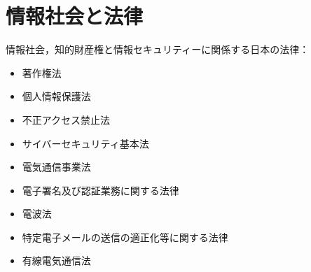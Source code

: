%

\section{情報社会と法律}
情報社会，知的財産権と情報セキュリティーに関係する日本の法律：
\begin{itemize}
   \item
   著作権法

   \item
   個人情報保護法
   \item   
   不正アクセス禁止法
   \item   
   サイバーセキュリティ基本法
   
   \item
   電気通信事業法
     \item    
   電子署名及び認証業務に関する法律
    \item     
   電波法
   \item   
   特定電子メールの送信の適正化等に関する法律
   \item   
   有線電気通信法
\end{itemize}


